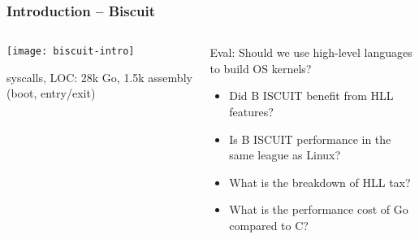 \begin{frame}[plain]
	\frametitle{Introduction -- Biscuit}
	
	\begin{columns}
		
		\begin{column}{.4\textwidth}
			
			\texttt{[image: biscuit-intro]}
			
			 syscalls, LOC: 28k Go,
			1.5k assembly (boot, entry/exit)
			
		\end{column}
		
		\begin{column}{.6\textwidth}
		Eval: Should we use high-level languages to build OS kernels?
			\begin{itemize}
				\item Did B ISCUIT benefit from HLL features?
				
				\item  Is B ISCUIT performance in the same league as Linux?
				
				\item What is the breakdown of HLL tax?
				
				\item  What is the performance cost of Go compared to C?
				
				
			\end{itemize}
			
			
		\end{column}
	\end{columns}	
\end{frame}


